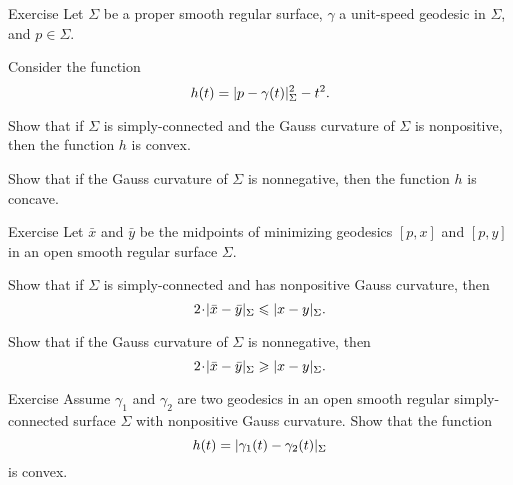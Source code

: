 \begin{thm}{Exercise}\label{ex:geod-convexity}
Let $\Sigma$ be a proper smooth regular surface, 
 $\gamma$  a unit-speed geodesic in $\Sigma$, and $p\in\Sigma$.

Consider the function
\[h(t)=\dist{p}{\gamma(t)}\Sigma^2-t^2.\]

\begin{subthm}{}
Show that if $\Sigma$ is simply-connected and the Gauss curvature of $\Sigma$ is nonpositive, then the function $h$ is convex.
\end{subthm}

\begin{subthm}{} Show that if the Gauss curvature of $\Sigma$ is nonnegative, then the function $h$ is concave.
\end{subthm}

\end{thm}


\begin{thm}{Exercise}\label{ex:midpoints}
Let $\bar x$ and $\bar y$ be the midpoints of minimizing geodesics $[p,x]$ and $[p,y]$ in an open smooth regular surface $\Sigma$.

\begin{subthm}{}
 Show that if $\Sigma$ is simply-connected and has nonpositive Gauss curvature, then 
 \[2\cdot \dist{\bar x}{\bar y}\Sigma\le \dist{x}{y}\Sigma.\]
 \end{subthm}
 
\begin{subthm}{} Show that if the Gauss curvature of $\Sigma$ is nonnegative, then 
 \[2\cdot \dist{\bar x}{\bar y}\Sigma\ge \dist{x}{y}\Sigma.\]
\end{subthm}

\end{thm}

\begin{thm}{Exercise}\label{ex:convex-dist}
Assume $\gamma_1$ and $\gamma_2$ are two geodesics in an open smooth regular simply-connected surface $\Sigma$ with nonpositive Gauss curvature.
Show that the function
\[h(t)=\dist{\gamma_1(t)}{\gamma_2(t)}\Sigma\]
is convex.
\end{thm}

